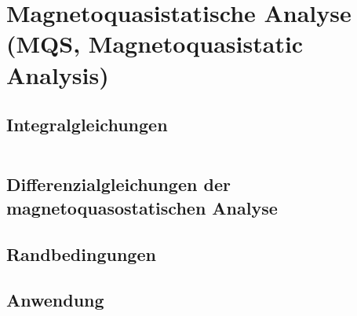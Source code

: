 \section{Magnetoquasistatische Analyse (MQS, Magnetoquasistatic Analysis)}
\subsection{Integralgleichungen}
\begin{tabular}{|p{} |p{}|}

\end{tabular}
\subsection{Differenzialgleichungen der magnetoquasostatischen Analyse}
\subsection{Randbedingungen}
\subsection{Anwendung}
\clearpage
\pagebreak